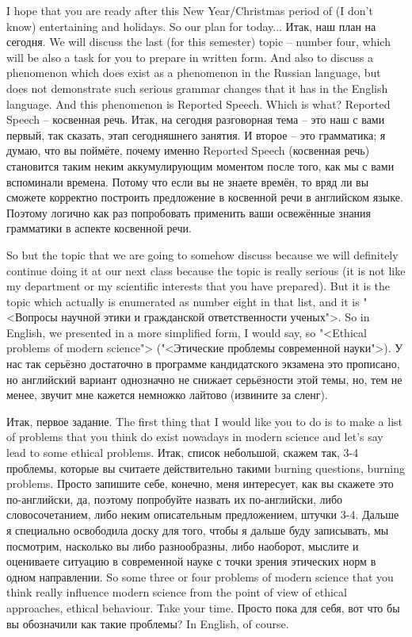 \documentclass[main.tex]{subfiles}
\begin{document}

I hope that you are ready after this New Year/Christmas period of (I don't know) entertaining and holidays.
So our plan for today...
Итак, наш план на сегодня.
We will discuss the last (for this semester) topic -- number four, which will be also a task for you to prepare in written form.
And also to discuss a phenomenon which does exist as a phenomenon in the Russian language, but does not demonstrate such serious grammar changes that it has in the English language.
And this phenomenon is Reported Speech.
Which is what?
Reported Speech -- косвенная речь.
Итак, на сегодня разговорная тема -- это наш с вами первый, так сказать, этап сегодняшнего занятия.
И второе -- это грамматика; я думаю, что вы поймёте, почему именно Reported Speech (косвенная речь) становится таким неким аккумулирующим моментом после того, как мы с вами вспоминали времена.
Потому что если вы не знаете времён, то вряд ли вы сможете корректно построить предложение в косвенной речи в английском языке.
Поэтому логично как раз попробовать применить ваши освежённые знания грамматики в аспекте косвенной речи.

So but the topic that we are going to somehow discuss because we will definitely continue doing it at our next class because the topic is really serious (it is not like my department or my scientific interests that you have prepared).
But it is the topic which actually is enumerated as number eight in that list, and it is "<Вопросы научной этики и гражданской ответственности ученых">.
So in English, we presented in a more simplified form, I would say, so "<Ethical problems of modern science"> ("<Этические проблемы современной науки">).
У нас так серьёзно достаточно в программе кандидатского экзамена это прописано, но английский вариант однозначно не снижает серьёзности этой темы, но, тем не менее, звучит мне кажется немножко лайтово (извините за сленг).

\newpage
{}

Итак, первое задание.
The first thing that I would like you to do is to make a list of problems that you think do exist nowadays in modern science and let's say lead to some ethical problems.
Итак, список небольшой, скажем так, 3-4 проблемы, которые вы считаете действительно такими burning questions, burning problems.
Просто запишите себе, конечно, меня интересует, как вы скажете это по-английски, да, поэтому попробуйте назвать их по-английски, либо словосочетанием, либо неким описательным предложением, штучки 3-4.
Дальше я специально освободила доску для того, чтобы я дальше буду записывать, мы посмотрим, насколько вы либо разнообразны, либо наоборот, мыслите и оцениваете ситуацию в современной науке с точки зрения этических норм в одном направлении.
So some three or four problems of modern science that you think really influence modern science from the point of view of ethical approaches, ethical behaviour.
Take your time.
Просто пока для себя, вот что бы вы обозначили как такие проблемы?
In English, of course.
\end{document}
